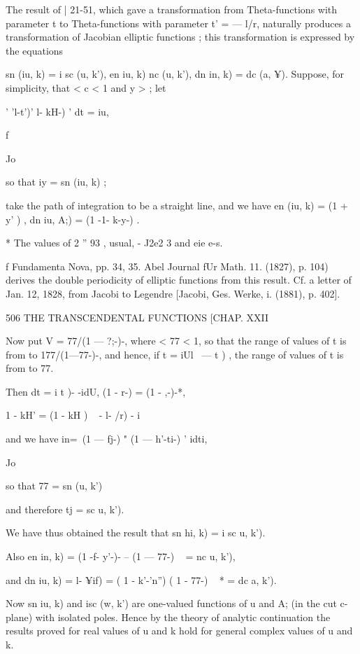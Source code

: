 The result of | 21-51, which gave a transformation from
Theta-functions with parameter t to Theta-functions with parameter t'
= — l/r, naturally produces a transformation of Jacobian elliptic
functions ; this transformation is expressed by the equations

sn (iu, k) = i sc (u, k'), en iu, k) nc (u, k'), dn in, k) = dc (a,
¥). Suppose, for simplicity, that < c < 1 and y > ; let

' 'l-t')' l- kH-) ' dt = iu,



f

Jo



so that iy = sn (iu, k) ;

take the path of integration to be a straight line, and we have en
(iu, k) = (1 + y' ) , dn iu, A;) = (1 -1- k-y-) .

* The values of 2 '' 93 , usual, - J2e2 3 and eie e-s.

f Fundamenta Nova, pp. 34, 35. Abel Journal fUr Math. 11. (1827), p.
104) derives the double periodicity of elliptic functions from this
result. Cf. a letter of Jan. 12, 1828, from Jacobi to Legendre
[Jacobi, Ges. Werke, i. (1881), p. 402].



506 THE TRANSCENDENTAL FUNCTIONS [CHAP. XXII

Now put V = 77/(1 — ?;-)-, where < 77 < 1, so that the range of values
of t is from to 177/(1—77-)-, and hence, if t = iUl \ — t ) , the
range of values of t is from to 77.

Then dt = i t )- -idU, (1 - r-) = (1 - ,-)-*,

1 - kH' = (1 - kH ) ~ - l- /r) - i

and we have in=\ (1 — fj-) " (1 — h'-ti-) ' idti,

Jo

so that 77 = sn (u, k')

and therefore tj = sc u, k').

We have thus obtained the result that sn hi, k) = i sc u, k').

Also en in, k) = (1 -f- y'-)- -- (1 — 77-) ~ = nc u, k'),

and dn iu, k) = l- ¥if) = ( 1 - k'-'n'') ( 1 - 77-) ~ * = dc a, k').

Now sn iu, k) and isc (w, k') are one-valued functions of u and A; (in
the cut c-plane) with isolated poles. Hence by the theory of analytic
continuation the results proved for real values of u and k hold for
general complex values of u and k.

